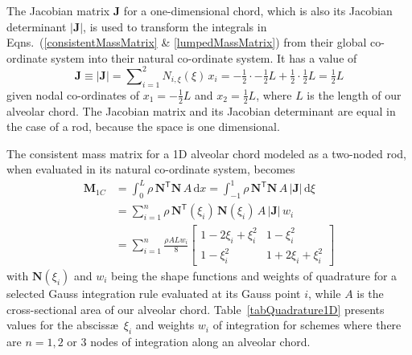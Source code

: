 The Jacobian matrix $\mathbf{J}$ for a one-dimensional chord, which is also its Jacobian determinant $| \mathbf{J} |$, is used to transform the integrals in Eqns.~(\ref{consistentMassMatrix} \& \ref{lumpedMassMatrix}) from their global co-ordinate system into their natural co-ordinate system.  It has a value of
\begin{equation}
\mathbf{J} \equiv | \mathbf{J} | = \sum\nolimits_{i=1}^2 N_{i,\xi} (\xi) \, x_i = 
-\tfrac{1}{2} \cdot -\tfrac{1}{2} L + \tfrac{1}{2} \cdot \tfrac{1}{2} L = 
\tfrac{1}{2} L
\label{detJac1D}
\end{equation}
given nodal co-ordinates of $x_1 = -\tfrac{1}{2} L$ and $x_2 = \tfrac{1}{2} L$, where $L$ is the length of our alveolar chord.  The Jacobian matrix and its Jacobian determinant are equal in the case of a rod, because the space is one dimensional. 

The consistent mass matrix for a 1D alveolar chord modeled as a two-noded rod, when evaluated in its natural co-ordinate system, becomes
\begin{equation} 
\begin{aligned}
\mathbf{M}_{1C} & = \int_0^L \rho \, \mathbf{N}^{\mathsf{T}} \mathbf{N} \, A \, \mathrm{d} x  = \int_{-1}^{1} \rho \, \mathbf{N}^{\mathsf{T}} \mathbf{N}\, A \, | \mathbf{J} | \,  \mathrm{d} \xi \\ & 
= \sum_{i=1}^n  \rho  \, \mathbf{N} ^{\mathsf{T}} (\xi_i) \, \mathbf{N}(\xi_i) \, A \, | \mathbf{J} | \, w_i \\ &
= \sum_{i=1}^n \frac{\rho A L w_i}{8} \begin{bmatrix}
1 - 2\xi_i + \xi_i^2 & 1 - \xi_i^2 \\
1 - \xi_i^2 & 1 + 2 \xi_i + \xi_i^2
\end{bmatrix}
\end{aligned}
\label{ConsMassMatrix1DA}
\end{equation}
with $\textbf{N} (\xi_i)$ and $w_i$ being the shape functions and weights of quadrature for a selected Gauss integration rule evaluated at its Gauss point $i$, while $A$ is the cross-sectional area of our alveolar chord. Table~\ref{tabQuadrature1D} presents values for the absciss\ae\ $\xi_i$ and weights $w_i$ of integration for schemes where there are $n = 1, 2$ or $3$ nodes of integration along an alveolar chord.  

